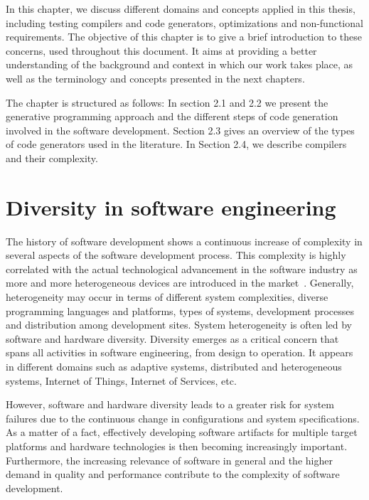  
In this chapter, we discuss different domains and concepts applied in this thesis, including testing compilers and code generators, optimizations and non-functional requirements.
The objective of this chapter is to give a brief introduction to these concerns, used throughout this document. It aims at providing a better understanding of the background and context in which our work takes place, as well as the terminology and concepts presented in the next chapters.

The chapter is structured as follows: In section 2.1 and 2.2 we present the generative programming approach and the different steps of code generation involved in the software development. Section 2.3 gives an overview of the types of code generators used in the literature. In Section 2.4, we describe compilers and their complexity.


\section{Diversity in software engineering}
The history of software development shows a continuous increase of complexity in several aspects of the software development process. This complexity is highly correlated with the actual technological advancement in the software industry as more and more heterogeneous devices are introduced in the market~\cite{betz2011improving}. 
Generally, heterogeneity may occur in terms of different system complexities, diverse programming languages and platforms, types of systems, development processes and distribution among development sites\cite{ghazi2015heterogeneous}.
System heterogeneity is often led by software and hardware diversity.
Diversity emerges as a critical concern that spans all activities in software engineering, from design to operation\cite{acher2014software}. It appears in different domains such as adaptive systems, distributed and heterogeneous systems, Internet of Things, Internet of Services, etc.

However, software and hardware diversity leads to a greater risk for system failures due to the continuous change in configurations and system specifications.
As a matter of a fact, effectively developing software artifacts for multiple target platforms and hardware technologies is then becoming increasingly important.
Furthermore, the increasing relevance of software in general and the higher demand in quality and performance contribute to the complexity of software development.


